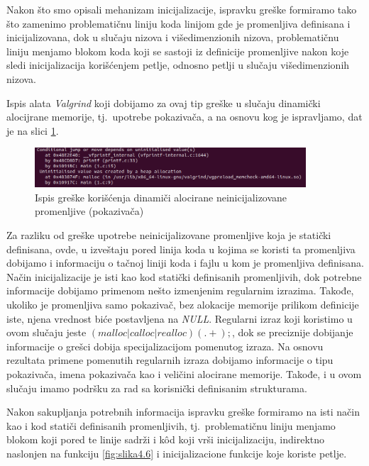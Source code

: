\documentclass[12pt,oneside]{memoir}
\theoremstyle{plain}
\theoremstyle{definition}
\begin{document}
Nakon što smo opisali mehanizam inicijalizacije, ispravku greške formiramo tako što zamenimo problematičnu liniju koda linijom gde je promenljiva definisana i inicijalizovana, dok u slučaju nizova i višedimenzionih nizova, problematičnu liniju menjamo blokom koda koji se sastoji iz definicije promenljive nakon koje sledi inicijalizacija korišćenjem petlje, odnosno petlji u slučaju višedimenzionih nizova. 

Ispis alata \textit{Valgrind} koji dobijamo za ovaj tip greške u slučaju dinamički alocijrane memorije, tj.~upotrebe pokazivača, a na osnovu kog je ispravljamo, dat je na slici \ref{fig:slika4.7}.

\begin{figure}[!ht]
  \centering
  \includegraphics[width=0.9\textwidth]{UninitialisedDinamic.png}
  \caption{Ispis greške korišćenja dinamiči alocirane neinicijalizovane promenljive (pokazivača)}
  \label{fig:slika4.7}
\end{figure} 

Za razliku od greške upotrebe neinicijalizovane promenljive koja je statički definisana, ovde, u izveštaju pored linija koda u kojima se koristi ta promenljiva dobijamo i informaciju o tačnoj liniji koda i fajlu u kom je promenljiva definisana. Način inicijalizacije je isti kao kod statički definisanih promenljivih, dok potrebne informacije dobijamo primenom nešto izmenjenim regularnim izrazima. Takođe, ukoliko je promenljiva samo pokazivač, bez alokacije memorije prilikom definicije iste, njena vrednost biće postavljena na \textit{NULL}. Regularni izraz koji koristimo u ovom slučaju jeste $ (malloc|calloc|realloc)(.+); $, dok se preciznije dobijanje informacije o grešci dobija specijalizacijom pomenutog izraza. Na osnovu rezultata primene pomenutih regularnih izraza dobijamo informacije o tipu pokazivača, imena pokazivača kao i veličini alocirane memorije. Takođe, i u ovom slučaju imamo podršku za rad sa korisnički definisanim strukturama. 

Nakon sakupljanja potrebnih informacija ispravku greške formiramo na isti način kao i kod statiči definisanih promenljivih, tj.~problematičnu liniju menjamo blokom koji pored te linije sadrži i k\^od koji vrši inicijalizaciju, indirektno naslonjen na funkciju \ref{fig:slika4.6} i inicijalizacione funkcije koje koriste petlje.
\end{document}
